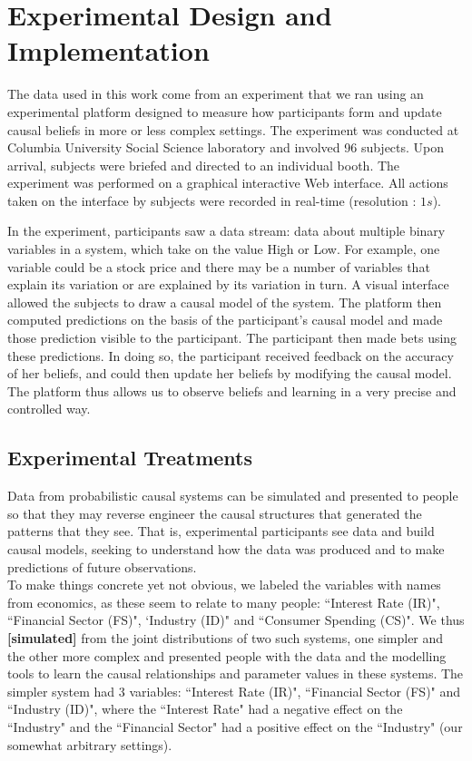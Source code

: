 \section{Experimental Design and Implementation}
\label{SI_experiment}

The data used in this work come from an experiment that we ran using an experimental platform designed to measure how participants form and update causal beliefs in more or less complex settings.  The experiment was conducted at Columbia University Social Science laboratory and involved 96 subjects.  Upon arrival, subjects were briefed and directed to an individual booth. The experiment was performed on a graphical interactive Web interface. All actions taken on the interface by subjects were recorded in real-time (resolution : $1s$). 

In the experiment, participants saw a data stream: data about multiple binary variables in a system, which take on the value High or Low. For example, one variable could be a stock price and there may be a number of variables that explain its variation or are explained by its variation in turn.  A visual interface allowed the subjects to draw a causal model of the system. The platform then computed predictions on the basis of the participant's causal model and made those prediction visible to the participant. The participant then made bets using these predictions. In doing so, the participant received feedback on the accuracy of her beliefs, and could then update her beliefs by modifying the causal model. The platform thus allows us to observe beliefs and learning in a very precise and controlled way.

\subsection{Experimental Treatments}
Data from probabilistic causal systems can be simulated and presented to people so that they may reverse engineer the causal structures that generated the patterns that they see. That is, experimental participants see data and build causal models, seeking to understand how the data was produced and to make predictions of future observations. \\

To make things concrete yet not obvious, we labeled the variables with names from economics, as these seem to relate to many 
people: ``Interest Rate (IR)", ``Financial Sector (FS)", `Industry (ID)" and ``Consumer Spending (CS)". We thus {\bf [simulated]} from the joint distributions of two such systems, one simpler and the other more complex and presented  people with the data and the modelling tools to learn the causal relationships and parameter values in these systems. The simpler system had 3 variables: ``Interest Rate (IR)", ``Financial Sector (FS)" and ``Industry (ID)", where the ``Interest Rate" had a negative effect on the ``Industry" and the ``Financial Sector" had a positive effect on the ``Industry" (our somewhat arbitrary settings).\\

